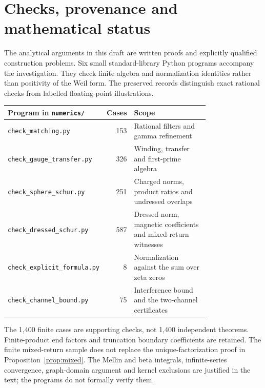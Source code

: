 \section{Checks, provenance and mathematical status}\label{app:checks}
The analytical arguments in this draft are written proofs and explicitly
qualified construction problems. Six small standard-library Python
programs accompany the investigation. They check finite algebra and
normalization identities rather than positivity of the Weil form.
The preserved records distinguish exact rational checks from labelled
floating-point illustrations.
\begin{center}
\small
\begin{tabular}{p{0.38\linewidth}rp{0.40\linewidth}}
\toprule
Program in \texttt{numerics/} & Cases & Scope \\
\midrule
\texttt{check\_matching.py} & 153 & Rational filters and gamma refinement \\
\texttt{check\_gauge\_transfer.py} & 326 & Winding, transfer and first-prime algebra \\
\texttt{check\_sphere\_schur.py} & 251 & Charged norms, product ratios and undressed overlaps \\
\texttt{check\_dressed\_schur.py} & 587 & Dressed norm, magnetic coefficients and mixed-return witnesses \\
\texttt{check\_explicit\_formula.py} & 8 & Normalization against the sum over zeta zeros \\
\texttt{check\_channel\_bound.py} & 75 & Interference bound and the two-channel certificates \\
\bottomrule
\end{tabular}
\end{center}
The 1,400 finite cases are supporting checks, not 1,400 independent
theorems. Finite-product end factors and truncation boundary
coefficients are retained. The finite mixed-return sample does not
replace the unique-factorization proof in Proposition~\ref{prop:mixed}.
The Mellin and beta integrals, infinite-series convergence,
graph-domain argument and kernel exclusions are justified in the text;
the programs do not formally verify them.

